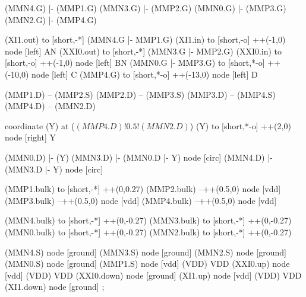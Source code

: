 \begin{circuitikz}[american]

	(MMN4.G) |- (MMP1.G)
	(MMN3.G) |- (MMP2.G)
	(MMN0.G) |- (MMP3.G)
	(MMN2.G) |- (MMP4.G)
	
	(XI1.out) to [short,-*] (MMN4.G |- MMP1.G)
	(XI1.in) to [short,-o] ++(-1,0) node [left] {AN}
	(XXI0.out) to [short,-*] (MMN3.G |- MMP2.G)
	(XXI0.in) to [short,-o] ++(-1,0) node [left] {BN}
	(MMN0.G |- MMP3.G) to [short,*-o] ++(-10,0) node [left] {C}
	(MMP4.G) to [short,*-o] ++(-13,0) node [left] {D}	
	
	(MMP1.D) -- (MMP2.S)
	(MMP2.D) -- (MMP3.S)	
	(MMP3.D) -- (MMP4.S)
	(MMP4.D) -- (MMN2.D)
	
	coordinate (Y) at ($(MMP4.D)!0.5!(MMN2.D)$)
	(Y) to [short,*-o] ++(2,0) node [right] {Y}
	
	(MMN0.D) |- (Y)
	(MMN3.D) |- (MMN0.D |- Y) node [circ] {}
	(MMN4.D) |- (MMN3.D |- Y) node [circ] {}
	
	(MMP1.bulk) to [short,-*] ++(0,0.27)
	(MMP2.bulk) --++(0.5,0) node [vdd] {}
	(MMP3.bulk) --++(0.5,0) node [vdd] {}
	(MMP4.bulk) --++(0.5,0) node [vdd] {}
	
	(MMN4.bulk) to [short,-*] ++(0,-0.27)
	(MMN3.bulk) to [short,-*] ++(0,-0.27)
	(MMN0.bulk) to [short,-*] ++(0,-0.27)
	(MMN2.bulk) to [short,-*] ++(0,-0.27)
	

	(MMN4.S) node [ground] {}
	(MMN3.S) node [ground] {}
	(MMN2.S) node [ground] {}
	(MMN0.S) node [ground] {}
	(MMP1.S) node [vdd] (VDD) {VDD}
	(XXI0.up) node [vdd] (VDD) {VDD}
	(XXI0.down) node [ground] {}
	(XI1.up) node [vdd] (VDD) {VDD}
	(XI1.down) node [ground] {}
;

\end{circuitikz}
